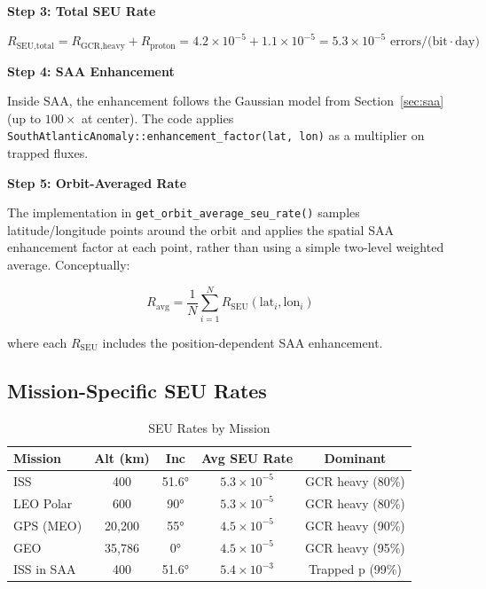\documentclass[11pt,a4paper]{article}
\begin{document}
\textbf{Step 3: Total SEU Rate}

\begin{equation}
R_{\text{SEU,total}} = R_{\text{GCR,heavy}} + R_{\text{proton}} = 4.2 \times 10^{-5} + 1.1 \times 10^{-5} = 5.3 \times 10^{-5} \text{ errors/(bit}\cdot\text{day)}
\end{equation}

\textbf{Step 4: SAA Enhancement}

Inside SAA, the enhancement follows the Gaussian model from Section~\ref{sec:saa} (up to $100\times$ at center). The code applies \texttt{SouthAtlanticAnomaly::enhancement\_factor(lat, lon)} as a multiplier on trapped fluxes.

\textbf{Step 5: Orbit-Averaged Rate}

The implementation in \texttt{get\_orbit\_average\_seu\_rate()} samples latitude/longitude points around the orbit and applies the spatial SAA enhancement factor at each point, rather than using a simple two-level weighted average. Conceptually:

\begin{equation}
R_{\text{avg}} = \frac{1}{N} \sum_{i=1}^{N} R_{\text{SEU}}(\text{lat}_i, \text{lon}_i)
\end{equation}

where each $R_{\text{SEU}}$ includes the position-dependent SAA enhancement.

\subsection{Mission-Specific SEU Rates}

\begin{table}[htbp]
\centering
\caption{SEU Rates by Mission}
\begin{tabular}{@{}lcccc@{}}
\toprule
\textbf{Mission} & \textbf{Alt (km)} & \textbf{Inc} & \textbf{Avg SEU Rate} & \textbf{Dominant} \\ \midrule
ISS & 400 & 51.6° & $5.3 \times 10^{-5}$ & GCR heavy (80\%) \\
LEO Polar & 600 & 90° & $5.3 \times 10^{-5}$ & GCR heavy (80\%) \\
GPS (MEO) & 20,200 & 55° & $4.5 \times 10^{-5}$ & GCR heavy (90\%) \\
GEO & 35,786 & 0° & $4.5 \times 10^{-5}$ & GCR heavy (95\%) \\
ISS in SAA & 400 & 51.6° & $5.4 \times 10^{-3}$ & Trapped p (99\%) \\ \bottomrule
\end{tabular}
\end{table}
\end{document}
